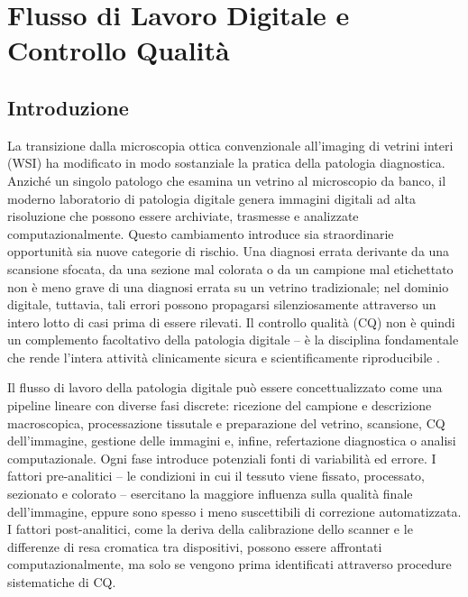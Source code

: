 
\chapter{Flusso di Lavoro Digitale e Controllo Qualità}
\label{ch:2}

\section{Introduzione}
\label{sec:ch2-intro}

La transizione dalla microscopia ottica convenzionale all'imaging di vetrini interi (WSI) ha
modificato in modo sostanziale la pratica della patologia diagnostica. Anziché un singolo
patologo che esamina un vetrino al microscopio da banco, il moderno laboratorio di patologia
digitale genera immagini digitali ad alta risoluzione che possono essere archiviate, trasmesse e
analizzate computazionalmente. Questo cambiamento introduce sia straordinarie opportunità sia
nuove categorie di rischio. Una diagnosi errata derivante da una scansione sfocata, da una
sezione mal colorata o da un campione mal etichettato non è meno grave di una diagnosi errata su
un vetrino tradizionale; nel dominio digitale, tuttavia, tali errori possono propagarsi
silenziosamente attraverso un intero lotto di casi prima di essere rilevati. Il controllo qualità
(CQ) non è quindi un complemento facoltativo della patologia digitale -- è la disciplina
fondamentale che rende l'intera attività clinicamente sicura e scientificamente riproducibile
\cite{bankhead2022}.

Il flusso di lavoro della patologia digitale può essere concettualizzato come una pipeline lineare
con diverse fasi discrete: ricezione del campione e descrizione macroscopica, processazione
tissutale e preparazione del vetrino, scansione, CQ dell'immagine, gestione delle immagini e,
infine, refertazione diagnostica o analisi computazionale. Ogni fase introduce potenziali fonti
di variabilità ed errore. I fattori pre-analitici -- le condizioni in cui il tessuto viene
fissato, processato, sezionato e colorato -- esercitano la maggiore influenza sulla qualità
finale dell'immagine, eppure sono spesso i meno suscettibili di correzione automatizzata. I
fattori post-analitici, come la deriva della calibrazione dello scanner e le differenze di resa
cromatica tra dispositivi, possono essere affrontati computazionalmente, ma solo se vengono prima
identificati attraverso procedure sistematiche di CQ.

